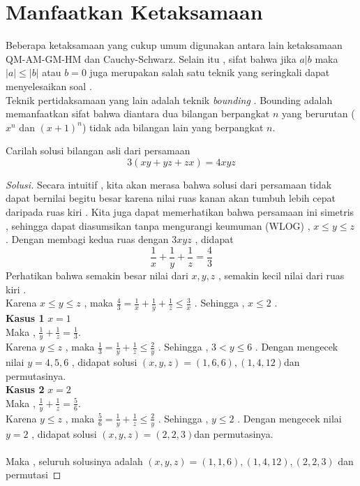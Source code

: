 \documentclass[11pt]{scrartcl}
\begin{document}
\section{Manfaatkan Ketaksamaan}
Beberapa ketaksamaan yang cukup umum digunakan antara lain ketaksamaan QM-AM-GM-HM dan Cauchy-Schwarz. Selain itu , sifat bahwa jika $a|b$ maka $|a|\leq|b|$ atau $b=0$ juga merupakan salah satu teknik yang seringkali dapat menyelesaikan soal . \\
Teknik pertidaksamaan yang lain adalah teknik \textit{bounding} . Bounding adalah memanfaatkan sifat bahwa diantara dua bilangan berpangkat $n$ yang berurutan ($x^n$ dan $(x+1)^n$) tidak ada bilangan lain yang berpangkat $n$. \\

\begin{example}
    Carilah solusi bilangan asli dari persamaan $$3(xy+yz+zx)=4xyz$$
\end{example}
    
\begin{proof}[Solusi]
    Secara intuitif , kita akan merasa bahwa solusi dari persamaan tidak dapat bernilai begitu besar karena nilai ruas kanan akan tumbuh lebih cepat daripada ruas kiri . Kita juga dapat memerhatikan bahwa persamaan ini simetris , sehingga dapat diasumsikan tanpa mengurangi keumuman (WLOG) , $x\leq y\leq z$ . Dengan membagi kedua ruas dengan $3xyz$ , didapat $$\frac{1}{x}+\frac{1}{y}+\frac{1}{z}=\frac{4}{3}$$
    Perhatikan bahwa semakin besar nilai dari $x,y,z$ , semakin kecil nilai dari ruas kiri . \\
    Karena $x\leq y\leq z$ , maka $\frac{4}{3}=\frac{1}{x}+\frac{1}{y}+\frac{1}{z}\leq\frac{3}{x}$ .
    Sehingga , $x\leq 2$ .\\
    \textbf{Kasus 1} $x=1$\\
    Maka , $\frac{1}{y}+\frac{1}{z}=\frac{1}{3}$.\\
    Karena $y\leq z$ , maka $\frac{1}{3}=\frac{1}{y}+\frac{1}{z}\leq\frac{2}{y}$ .
    Sehingga , $3<y\leq 6$ . Dengan mengecek nilai $y=4,5,6$ , didapat solusi $(x,y,z)=(1,6,6),(1,4,12)$dan permutasinya.\\
    \textbf{Kasus 2} $x=2$ \\
    Maka , $\frac{1}{y}+\frac{1}{z}=\frac{5}{6}$.\\
    Karena $y\leq z$ , maka $\frac{5}{6}=\frac{1}{y}+\frac{1}{z}\leq\frac{2}{y}$ .
    Sehingga , $y\leq 2$ . Dengan mengecek nilai $y=2$ , didapat solusi $(x,y,z)=(2,2,3)$dan permutasinya.\\
    \\
    Maka , seluruh solusinya adalah $(x,y,z)=(1,1,6),(1,4,12),(2,2,3)$ dan permutasi
\end{proof}
\end{document}
